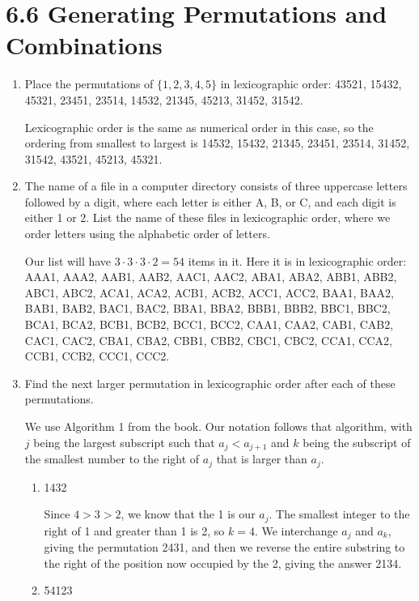 \documentclass[11pt]{article}
\begin{document}
\section*{\textbf{6.6 Generating Permutations and Combinations}}
\begin{enumerate}[label=\textbf{\arabic*.}]
	\item Place the permutations of $\{1, 2, 3, 4, 5\}$ in lexicographic order: 43521, 15432, 45321, 23451, 23514, 14532, 21345, 45213, 31452, 31542.
	
	Lexicographic order is the same as numerical order in this case, so the ordering from smallest to largest is 14532, 15432, 21345, 23451, 23514, 31452, 31542, 43521, 45213, 45321.
	
	\item The name of a file in a computer directory consists of three uppercase letters followed by a digit, where each letter is either A, B, or C, and each digit is either 1 or 2. List the name of these files in lexicographic order, where we order letters using the alphabetic order of letters.
	
	Our list will have $3 \cdot 3 \cdot 3 \cdot 2 = 54$ items in it. Here it is in lexicographic order: AAA1, AAA2, AAB1, AAB2, AAC1, AAC2, ABA1, ABA2, ABB1, ABB2, ABC1, ABC2, ACA1, ACA2, ACB1, ACB2, ACC1, ACC2, BAA1, BAA2, BAB1, BAB2, BAC1, BAC2, BBA1, BBA2, BBB1, BBB2, BBC1, BBC2, BCA1, BCA2, BCB1, BCB2, BCC1, BCC2, CAA1, CAA2, CAB1, CAB2, CAC1, CAC2, CBA1, CBA2, CBB1, CBB2, CBC1, CBC2, CCA1, CCA2, CCB1, CCB2, CCC1, CCC2.
	
	\item Find the next larger permutation in lexicographic order after each of these permutations.
	
	We use Algorithm 1 from the book. Our notation follows that algorithm, with $j$ being the largest subscript such that $a_j < a_{j + 1}$ and $k$ being the subscript of the smallest number to the right of $a_j$ that is larger than $a_j$.
	
	\begin{enumerate}[label=\textbf{\alph*)}]
		\item 1432
		
		Since $4 > 3 > 2$, we know that the 1 is our $a_j$. The smallest integer to the right of 1 and greater than 1 is 2, so $k = 4$. We interchange $a_j$ and $a_k$, giving the permutation 2431, and then we reverse the entire substring to the right of the position now occupied by the 2, giving the answer 2134.
		
		\item 54123
		

\end{enumerate}
\end{enumerate}
\end{document}
